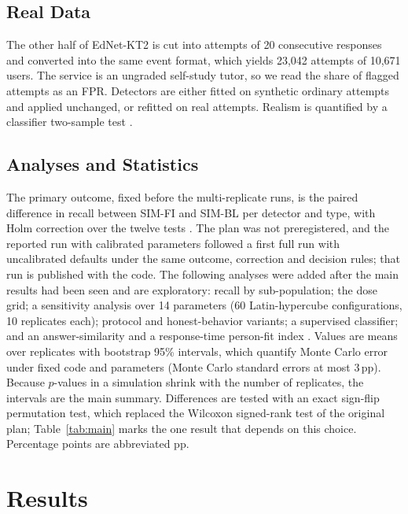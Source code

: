 \documentclass[conference,a4paper]{IEEEtran}
\newcommand{\pp}{\,pp}
\begin{document}
\subsection{Real Data}
The other half of EdNet-KT2 is cut into attempts of 20 consecutive responses and converted into the same event format, which yields 23,042 attempts of 10,671 users. The service is an ungraded self-study tutor, so we read the share of flagged attempts as an FPR. Detectors are either fitted on synthetic ordinary attempts and applied unchanged, or refitted on real attempts. Realism is quantified by a classifier two-sample test \cite{lopezpaz2017c2st}.

\subsection{Analyses and Statistics}
The primary outcome, fixed before the multi-replicate runs, is the paired difference in recall between SIM-FI and SIM-BL per detector and type, with Holm correction over the twelve tests \cite{holm1979simple}. The plan was not preregistered, and the reported run with calibrated parameters followed a first full run with uncalibrated defaults under the same outcome, correction and decision rules; that run is published with the code. The following analyses were added after the main results had been seen and are exploratory: recall by sub-population; the dose grid; a sensitivity analysis over 14 parameters (60 Latin-hypercube configurations, 10 replicates each); protocol and honest-behavior variants; a supervised classifier; and an answer-similarity and a response-time person-fit index \cite{marianti2014aberrant}. Values are means over replicates with bootstrap 95\% intervals, which quantify Monte Carlo error under fixed code and parameters (Monte Carlo standard errors at most 3\pp{}). Because $p$-values in a simulation shrink with the number of replicates, the intervals are the main summary. Differences are tested with an exact sign-flip permutation test, which replaced the Wilcoxon signed-rank test of the original plan; Table~\ref{tab:main} marks the one result that depends on this choice. Percentage points are abbreviated pp.

\section{Results}
\end{document}
